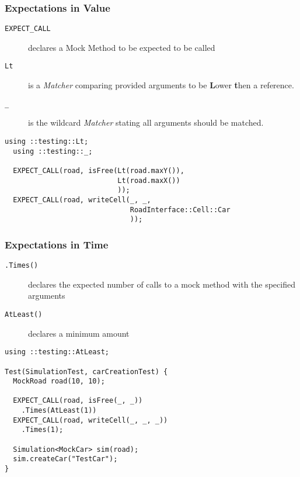 \documentclass{beamer}
\begin{document}
\begin{frame}[fragile]
  \frametitle{Expectations in Value}
  \begin{description}
    \item[\tt EXPECT\_CALL] declares a Mock Method to be expected to be called
    \item[\tt Lt] is a {\it Matcher} comparing provided arguments to be {\bf L}ower {\bf t}hen a reference.
    \item[\tt \_] is the wildcard {\it Matcher} stating all arguments should be matched.
   \end{description}
  \begin{lstlisting}[title=Expecations on Value Example, style=code, basicstyle=\ttfamily\footnotesize\color{white}]
  using ::testing::Lt;
  using ::testing::_;

  EXPECT_CALL(road, isFree(Lt(road.maxY()),
                           Lt(road.maxX())
                           ));
  EXPECT_CALL(road, writeCell(_, _, 
                              RoadInterface::Cell::Car
                              ));
  \end{lstlisting}
\end{frame}

\begin{frame}[fragile]
  \frametitle{Expectations in Time}
  \begin{description}
    \item[\tt .Times()] declares the expected number of calls to a mock method with the specified arguments
    \item[\tt AtLeast()] declares a minimum amount
  \end{description}
  \begin{lstlisting}[title=Expectations on Time Example, style=code, basicstyle=\ttfamily\footnotesize\color{white}]
using ::testing::AtLeast;

Test(SimulationTest, carCreationTest) {
  MockRoad road(10, 10);
  
  EXPECT_CALL(road, isFree(_, _))
    .Times(AtLeast(1))
  EXPECT_CALL(road, writeCell(_, _, _))
    .Times(1);

  Simulation<MockCar> sim(road);
  sim.createCar("TestCar");
}
  \end{lstlisting}

\end{frame}
\end{document}
